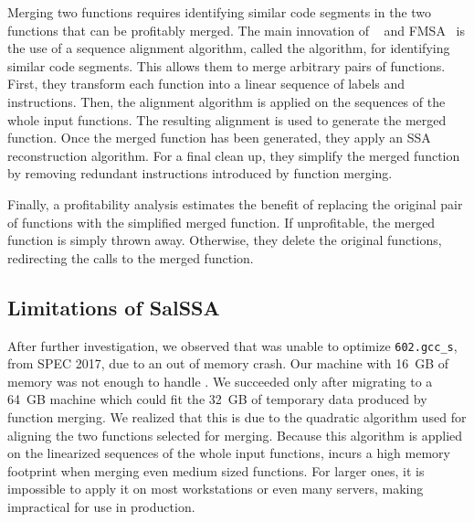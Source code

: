 Merging two functions requires identifying similar code segments in the two functions that can be profitably merged.
The main innovation of \SOAName~\cite{rocha20} and FMSA~\cite{rocha19} is the use of a sequence alignment algorithm, called the \NW algorithm, for identifying similar code segments.
This allows them to merge arbitrary pairs of functions.
First, they transform each function into a linear sequence of labels and instructions.
Then, the alignment algorithm is applied on the sequences of the whole input functions.
The resulting alignment is used to generate the merged function.
Once the merged function has been generated, they apply an SSA reconstruction algorithm.
For a final clean up, they simplify the merged function by removing redundant instructions introduced by function merging.

Finally, a profitability analysis estimates the benefit of replacing the original pair of functions with the simplified merged function. If unprofitable, the merged function is simply thrown away. Otherwise, they delete the original functions, redirecting the calls to the merged function.

\subsection{Limitations of SalSSA}

After further investigation, we observed that {\SOAName} was unable to optimize \texttt{602.gcc\_s}, from SPEC 2017, due to an out of memory crash.
Our machine with 16~GB of memory was not enough to handle {\SOAName}.
We succeeded only after migrating to a 64~GB machine which could fit the 32~GB of temporary data produced by function merging.
We realized that this is due to the quadratic algorithm used for aligning the two functions selected for merging.
Because this algorithm is applied on the linearized sequences of the whole input functions, \SOAName incurs a high memory footprint when merging even medium sized functions.
For larger ones, it is impossible to apply it on most workstations or even many servers, making {\SOAName} impractical for use in production.


